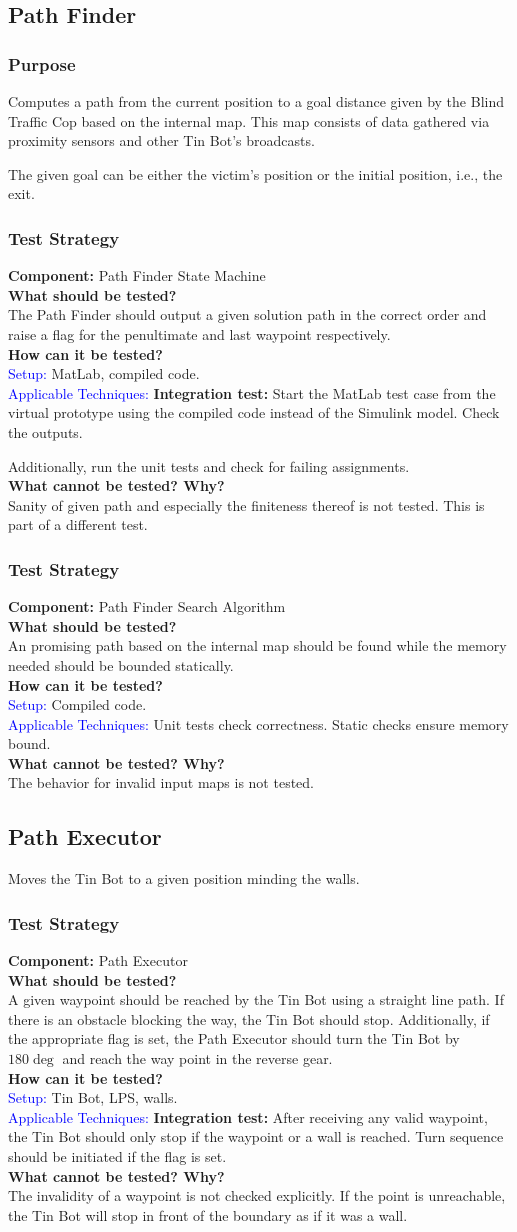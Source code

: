 \documentclass[a4paper,parskip,headheight=38pt]{scrartcl} %
\newcommand{\teststrat}[5]{
    \subsubsection{Test Strategy}
	\textbf{Component:} #1 \\
	\noindent\textbf{What should be tested?} \\
    \noindent #2 \\
	\noindent\textbf{How can it be tested?} \\
    \noindent\textcolor{blue}{Setup:} #3 \\
    \noindent\textcolor{blue}{Applicable Techniques:} #4 \\
	\noindent\textbf{What cannot be tested? Why?} \\
    \noindent #5
}
\newcommand{\ie}{i.e.}
\newcommand{\BLACK}{\textbf{Integration test: }}
\begin{document}
\subsection{Path Finder}
\subsubsection{Purpose}
Computes a path from the current position to a goal distance given by the Blind
Traffic Cop based on the internal map. This map consists of data gathered via
proximity sensors and other Tin Bot's broadcasts.

The given goal can be either the victim's position or the initial position, \ie,
the exit.
\teststrat{Path Finder State Machine}{
    The Path Finder should output a given solution path in the correct order and
    raise a flag for the penultimate and last waypoint respectively.
}{
    MatLab, compiled code.
}{
    \BLACK Start the MatLab test case from the virtual prototype using
    the compiled code instead of the Simulink model. Check the outputs.

    Additionally, run the unit tests and check for failing assignments.
}{
    Sanity of given path and especially the finiteness thereof is not tested.
    This is part of a different test.
}

\teststrat{Path Finder Search Algorithm}{
    An promising path based on the internal map should be found while the memory
    needed should be bounded statically.
}{
    Compiled code.
}{
    Unit tests check correctness. Static checks ensure memory bound.
}{
    The behavior for invalid input maps is not tested.
}

\subsection{Path Executor}
Moves the Tin Bot to a given position minding the walls.
\teststrat{Path Executor}{
    A given waypoint should be reached by the Tin Bot using a straight line
    path. If there is an obstacle blocking the way, the Tin Bot should stop.
    Additionally, if the appropriate flag is set, the Path Executor should turn
    the Tin Bot by $180\deg$ and reach the way point in the reverse gear.
}{
    Tin Bot, LPS, walls.
}{
    \BLACK After receiving any valid waypoint, the Tin Bot should
    only stop if the waypoint or a wall is reached. Turn sequence should be
    initiated if the flag is set.
}{
    The invalidity of a waypoint is not checked explicitly. If the point is
    unreachable, the Tin Bot will stop in front of the boundary as if it was a
    wall.
}
\end{document}
